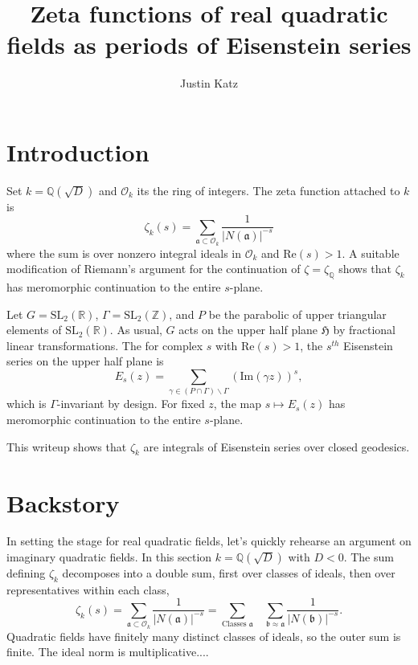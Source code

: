 \documentclass[11pt]{amsart}
\title{Zeta functions of real quadratic fields as periods of Eisenstein series}
\author{Justin Katz}
\newcommand{\half}{\mathfrak{H}}
\newcommand{\Q}{\mathbb{Q}}
\newcommand{\R}{\mathbb{R}}
\newcommand{\Z}{\mathbb{Z}}
\newcommand{\SL}{\text{SL}}
\newcommand{\intring}{\mathcal{O}}
\newcommand{\gothic}[1]{\mathfrak{#1}}
\newcommand{\im}{\text{Im}}
\newcommand{\re}{\text{Re}}
\begin{document}
\maketitle

\section{Introduction}

Set $k=\Q(\sqrt{D})$ and $\intring_k$ its the ring of integers. The zeta function attached to $k$ is
\begin{equation*}
\zeta_k(s)=\sum_{\gothic{a}\subset \intring_k} \frac{1}{|N(\gothic{a})|^{-s}}
\end{equation*}
where the sum is over nonzero integral ideals in $\intring_k$ and $\re(s)>1$. A suitable modification of Riemann's argument for the continuation of $\zeta=\zeta_\Q$ shows that $\zeta_k$ has meromorphic continuation to the entire $s$-plane.

Let $G=\SL_2(\R)$, $\Gamma=\SL_2(\Z)$, and $P$ be the parabolic of upper triangular elements of $\SL_2(\R)$. As usual, $G$ acts on the upper half plane $\half$ by fractional linear transformations. The for complex $s$ with $\re(s)>1$, the $s^{th}$ Eisenstein series on the upper half plane is
\begin{equation*}
E_s(z)=\sum_{\gamma \in (P\cap \Gamma)\backslash \Gamma} (\im(\gamma z))^s,
\end{equation*}
which is $\Gamma$-invariant by design. For fixed $z$, the map $s\mapsto E_s(z)$ has meromorphic continuation to the entire $s$-plane.

This writeup shows that $\zeta_k$ are integrals of Eisenstein series over closed geodesics.

\section{Backstory}
In setting the stage for real quadratic fields, let's quickly rehearse an argument on imaginary quadratic fields.  In this section $k=\Q(\sqrt{D})$ with $D<0$. The sum defining $\zeta_k$ decomposes into a double sum, first over classes of ideals, then over representatives within each class,
\begin{equation*}
\zeta_k(s)=\sum_{\gothic{a}\subset \intring_k} \frac{1}{|N(\gothic{a})|^{-s}} = \sum_{\text{Classes } \gothic{a}} \hspace{10pt}  \sum_{\gothic{b}\approx \gothic{a}} \frac{1}{|N(\gothic{b})|^{-s}}.
\end{equation*}
Quadratic fields have finitely many distinct classes of ideals, so the outer sum is finite. The ideal norm is multiplicative....
\end{document}
